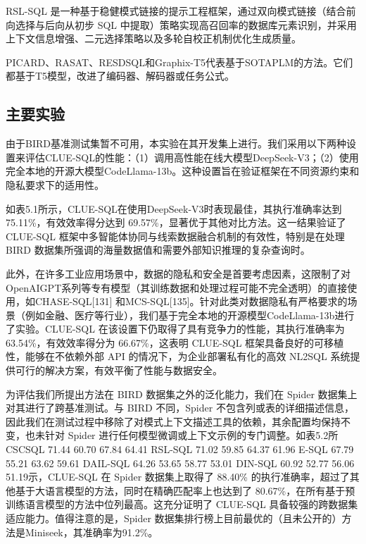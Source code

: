 \documentclass[12pt,a4paper,openright,UTF8]{ctexbook}
\begin{document}
RSL-SQL 是一种基于稳健模式链接的提示工程框架，通过双向模式链接（结合前向选择与后向从初步 SQL 中提取）策略实现高召回率的数据库元素识别，并采用上下文信息增强、二元选择策略以及多轮自校正机制优化生成质量。


PICARD、RASAT、RESDSQL和Graphix-T5代表基于SOTAPLM的方法。它们都基于T5模型，改进了编码器、解码器或任务公式。

\subsection{主要实验}

由于BIRD基准测试集暂不可用，本实验在其开发集上进行。我们采用以下两种设置来评估CLUE-SQL的性能：（1）调用高性能在线大模型DeepSeek-V3；（2）使用完全本地的开源大模型CodeLlama-13b。这种设置旨在验证框架在不同资源约束和隐私要求下的适用性。


如表5.1所示，CLUE-SQL在使用DeepSeek-V3时表现最佳，其执行准确率达到 75.11\%，有效效率得分达到 69.57\%，显著优于其他对比方法。这一结果验证了 CLUE-SQL 框架中多智能体协同与线索数据融合机制的有效性，特别是在处理BIRD 数据集所强调的海量数据值和需要外部知识推理的复杂查询时。


此外，在许多工业应用场景中，数据的隐私和安全是首要考虑因素，这限制了对OpenAIGPT系列等专有模型（其训练数据和处理过程可能不完全透明）的直接使用，如CHASE-SQL[131] 和MCS-SQL[135]。针对此类对数据隐私有严格要求的场景（例如金融、医疗等行业），我们基于完全本地的开源模型CodeLlama-13b进行了实验。CLUE-SQL 在该设置下仍取得了具有竞争力的性能，其执行准确率为63.54\%，有效效率得分为 66.67\%，这表明 CLUE-SQL 框架具备良好的可移植性，能够在不依赖外部 API 的情况下，为企业部署私有化的高效 NL2SQL 系统提供可行的解决方案，有效平衡了性能与数据安全。


为评估我们所提出方法在 BIRD 数据集之外的泛化能力，我们在 Spider 数据集上对其进行了跨基准测试。与 BIRD 不同，Spider 不包含列或表的详细描述信息，因此我们在测试过程中移除了对模式上下文描述工具的依赖，其余配置均保持不变，也未针对 Spider 进行任何模型微调或上下文示例的专门调整。如表5.2所CSCSQL 71.44 60.70 67.84 64.41 RSL-SQL 71.02 59.85 64.37 61.96 E-SQL 67.79 55.21 63.62 59.61 DAIL-SQL 64.26 53.65 58.77 53.01 DIN-SQL 60.92 52.77 56.06 51.19示，CLUE-SQL 在 Spider 数据集上取得了 88.40\% 的执行准确率，超过了其他基于大语言模型的方法，同时在精确匹配率上也达到了 80.67\%，在所有基于预训练语言模型的方法中位列最高。这充分证明了 CLUE-SQL 具备较强的跨数据集适应能力。值得注意的是，Spider 数据集排行榜上目前最优的（且未公开的）方法是Miniseek，其准确率为91.2\%。

\begin{table}[htbp]
\centering
\caption{表5.2CLUE-SQL在Spider数据集上的表现（EX/EM）}
\end{table}
\end{document}
